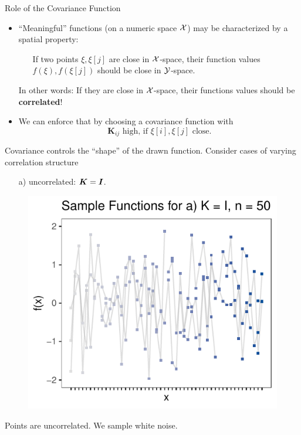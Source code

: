 \documentclass[11pt,compress,t,notes=noshow, xcolor=table]{beamer}
\begin{document}
\begin{vbframe}{Role of the Covariance Function}

\begin{itemize}
  \item \enquote{Meaningful} functions (on a numeric space $\mathcal{X}$) may be characterized by a spatial property: \vspace*{0.2cm}
  \begin{itemize}
    \item[] If two points $\xi, \xi[j]$ are close in $\mathcal{X}$-space, their function values $f(\xi), f(\xi[j])$ should be close in $\mathcal{Y}$-space.
  \end{itemize} \vspace*{0.2cm}
  In other words: If they are close in $\mathcal{X}$-space, their functions values should be \textbf{correlated}! \vspace*{0.4cm}
  \item We can enforce that by choosing a covariance function with
  $$
    \bm{K}_{ij} \text{ high, if } \xi[i], \xi[j] \text{ close.}
  $$
  \end{itemize}

\framebreak

Covariance controls the \enquote{shape} of the drawn function. Consider cases of varying correlation structure
\vspace{10pt}

\begin{enumerate}
  \item[a)] uncorrelated: $\bm{K} = \boldsymbol{I}$.
\end{enumerate}

\begin{figure}
  \includegraphics[width=0.45\linewidth]{figure/discrete/example_extreme_50_1.pdf}
\end{figure}

Points are uncorrelated. We sample white noise.

\end{vbframe}
\end{document}
